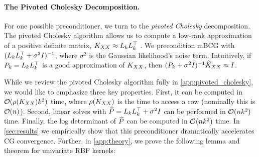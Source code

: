 \paragraph{The Pivoted Cholesky Decomposition.}
For one possible preconditioner, we turn to the \emph{pivoted Cholesky} decomposition.
The pivoted Cholesky algorithm allows us to compute a low-rank approximation of a positive definite matrix, $K_{XX} \approx L_{k} L_{k}^{\top}$ \cite{harbrecht2012low}.
We precondition mBCG with $(L_k L_k^\top + \sigma^2 I)^{-1}$, where $\sigma^2$ is the Gaussian likelihood's noise term.
Intuitively, if $P_{k}=L_{k}L_{k}^{\top}$ is a good approximation of $K_{XX}$, then $(P_{k} + \sigma^{2}I)^{-1}\widehat{K}_{XX} \approx I$.

While we review the pivoted Cholesky algorithm fully in \cref{app:pivoted_cholesky}, we would like to emphasize three key properties. First, it can be computed in $\bigo{\row{\bK_{\bX\bX}}k^{2}}$ time, where $\rho ( K_{XX} )$ is the time to access a row (nominally this is $\bigo{n}$).
Second, linear solves with $\widehat{P} = L_{k}L_{k}^{\top} + \sigma^{2}I$ can be performed in $\bigo{nk^{2}}$ time. Finally, the log determinant of $\widehat{P}$ can be computed in $\bigo{nk^{2}}$ time.
In \cref{sec:results} we empirically show that this preconditioner dramatically accelerates CG convergence.
Further, in \cref{app:theory}, we prove the following lemma and theorem for univariate RBF kernels:

